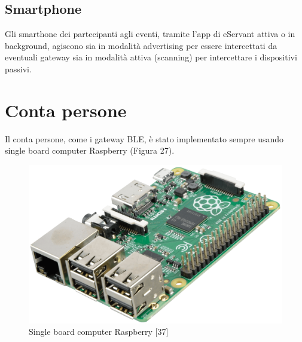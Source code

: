 \begin{figure}[!ht]
\end{figure}

\paragraph{}
\paragraph{}\paragraph{}
\paragraph{}\paragraph{}
\paragraph{}

\subsection{Smartphone}
Gli smarthone dei partecipanti agli eventi, tramite l'app di eServant attiva o in background, agiscono
sia in modalità advertising per essere intercettati da eventuali gateway sia in modalità attiva (scanning) per 
intercettare i dispositivi passivi.

\section{Conta persone}

Il conta persone, come i gateway BLE, è stato implementato sempre usando single board computer
Raspberry (Figura 27).

\begin{figure}[H]
    \centering  
    \caption{Single board computer Raspberry [37]}
    \includegraphics[scale=0.2]{img/cap4/raspberry}
\end{figure}

